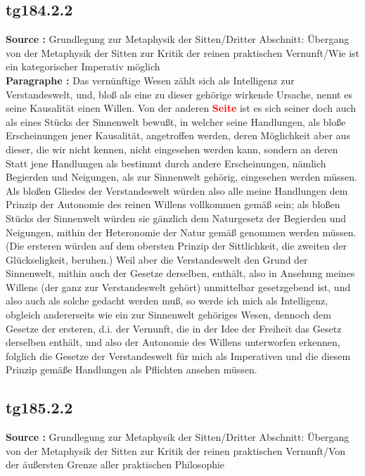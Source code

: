 \documentclass[a4paper,12pt,twoside]{book}
\newcommand{\match}[1]{\textcolor{red}{\textbf{#1}}}
\begin{document}
	\subsection*{tg184.2.2} 
	\textbf{Source : }Grundlegung zur Metaphysik der Sitten/Dritter Abschnitt: Übergang von der Metaphysik der Sitten zur Kritik der reinen praktischen Vernunft/Wie ist ein kategorischer Imperativ möglich\\  
	
	\noindent\textbf{Paragraphe : }Das vernünftige Wesen zählt sich als Intelligenz zur Verstandeswelt, und, bloß als eine zu dieser gehörige wirkende Ursache, nennt es seine Kausalität einen Willen. Von der anderen \match{Seite} ist es sich seiner doch auch als eines Stücks der Sinnenwelt bewußt, in welcher seine Handlungen, als bloße Erscheinungen jener Kausalität, angetroffen werden, deren Möglichkeit aber aus dieser, die wir nicht kennen, nicht eingesehen werden kann, sondern an deren Statt jene Handlungen als bestimmt durch andere Erscheinungen, nämlich Begierden und Neigungen, als zur Sinnenwelt gehörig, eingesehen werden müssen. Als bloßen Gliedes der Verstandeswelt würden also alle meine Handlungen dem  Prinzip der Autonomie des reinen Willens vollkommen gemäß sein; als bloßen Stücks der Sinnenwelt würden sie gänzlich dem Naturgesetz der Begierden und Neigungen, mithin der Heteronomie der Natur gemäß genommen werden müssen. (Die ersteren würden auf dem obersten Prinzip der Sittlichkeit, die zweiten der Glückseligkeit, beruhen.) Weil aber die Verstandeswelt den Grund der Sinnenwelt, mithin auch der Gesetze derselben, enthält, also in Ansehung meines Willens (der ganz zur Verstandeswelt gehört) unmittelbar gesetzgebend ist, und also auch als solche gedacht werden muß, so werde ich mich als Intelligenz, obgleich andererseits wie ein zur Sinnenwelt gehöriges Wesen, dennoch dem Gesetze der ersteren, d.i. der Vernunft, die in der Idee der Freiheit das Gesetz derselben enthält, und also der Autonomie des Willens unterworfen erkennen, folglich die Gesetze der Verstandeswelt für mich als Imperativen und die diesem Prinzip gemäße Handlungen als Pflichten ansehen müssen. 
	
	\subsection*{tg185.2.2} 
	\textbf{Source : }Grundlegung zur Metaphysik der Sitten/Dritter Abschnitt: Übergang von der Metaphysik der Sitten zur Kritik der reinen praktischen Vernunft/Von der äußersten Grenze aller praktischen Philosophie\\  
	
\end{document}

